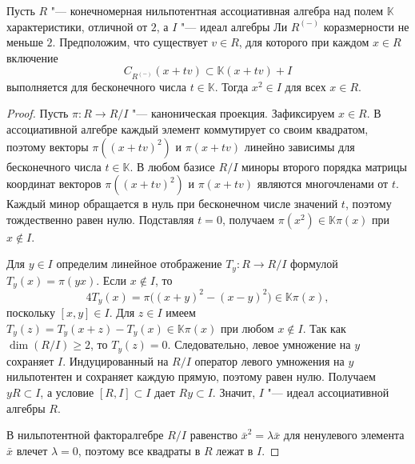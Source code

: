 \documentclass[a4paper,14pt,oneside,openany]{memoir}
\begin{document}
\begin{lemma}\label{l:assoc-centralizer-squares}
    Пусть $R$ "--- конечномерная нильпотентная ассоциативная алгебра над полем
    $\mathbb{K}$ характеристики, отличной от $2$, а $I$ "--- идеал алгебры Ли
    $R^{(-)}$ коразмерности не меньше $2$. Предположим, что существует $v\in R$,
    для которого при каждом $x\in R$ включение
    \[
        C_{R^{(-)}}(x+tv)\subset\mathbb{K}(x+tv)+I
    \]
    выполняется для бесконечного числа $t\in\mathbb{K}$. Тогда $x^2\in I$ для всех
    $x\in R$.
\end{lemma}
\begin{proof}
    Пусть $\pi\colon R\to R/I$ "--- каноническая проекция. Зафиксируем $x\in R$. В
    ассоциативной алгебре каждый элемент коммутирует со своим квадратом, поэтому
    векторы $\pi((x+tv)^2)$ и $\pi(x+tv)$ линейно зависимы для бесконечного числа
    $t\in\mathbb{K}$. В любом базисе $R/I$ миноры второго порядка матрицы координат
    векторов $\pi((x+tv)^2)$ и $\pi(x+tv)$ являются многочленами от $t$. Каждый
    минор обращается в нуль при бесконечном числе значений $t$, поэтому
    тождественно равен нулю. Подставляя $t=0$, получаем
    $\pi(x^2)\in\mathbb{K}\pi(x)$ при $x\notin I$.

    Для $y\in I$ определим линейное отображение $T_y\colon R\to R/I$ формулой
    $T_y(x)=\pi(yx)$. Если $x\notin I$, то
    \[
        4T_y(x)=\pi\bigl((x+y)^2-(x-y)^2\bigr)\in\mathbb{K}\pi(x),
    \]
    поскольку $[x,y]\in I$. Для $z\in I$ имеем
    $T_y(z)=T_y(x+z)-T_y(x)\in\mathbb{K}\pi(x)$ при любом $x\notin I$. Так как
    $\dim(R/I)\geq2$, то $T_y(z)=0$. Следовательно, левое умножение на $y$
    сохраняет $I$. Индуцированный на $R/I$ оператор левого умножения на $y$
    нильпотентен и сохраняет каждую прямую, поэтому равен нулю. Получаем $yR\subset
    I$, а условие $[R,I]\subset I$ дает $Ry\subset I$. Значит, $I$ "--- идеал
    ассоциативной алгебры $R$.

    В нильпотентной факторалгебре $R/I$ равенство $\bar x^2=\lambda\bar x$ для
    ненулевого элемента $\bar x$ влечет $\lambda=0$, поэтому все квадраты в $R$
    лежат в $I$.
\end{proof}
\end{document}
